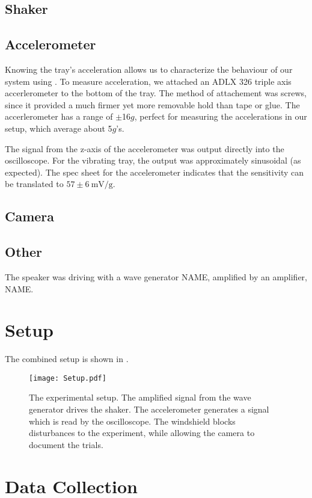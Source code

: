 \subsection{Shaker}

\subsection{Accelerometer}  
    Knowing the tray's acceleration allows us to characterize the behaviour of our system using . To measure acceleration, we attached an ADLX 326 triple axis accerlerometer to the bottom of the tray. The method of attachement was screws, since it provided a much firmer yet more removable hold than tape or glue. The accerlerometer has a range of $\pm$16$g$, perfect for measuring the accelerations in our setup, which average about 5$g$'s. 
      
      The signal from the z-axis of the accelerometer was output directly into the oscilloscope. For the vibrating tray, the output was approximately sinusoidal (as expected). The spec sheet for the accelerometer indicates that the sensitivity can be translated to $57 \pm 6~\mathrm{mV/g}$. 

\subsection{Camera} 

\subsection{Other}
    The speaker was driving with a wave generator NAME, amplified by an amplifier, NAME.    
 
\section{Setup}
    The combined setup is shown in .
    
\begin{figure}[h!]
	\centering
	\texttt{[image: Setup.pdf]}
	\caption{The experimental setup. The amplified signal from the wave generator drives the shaker. The accelerometer generates a signal which is read by the oscilloscope. The windshield blocks disturbances to the experiment, while allowing the camera to document the trials.}
	\label{setup}
\end{figure}

\section{Data Collection}


